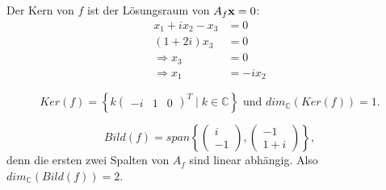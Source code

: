\documentclass{../mfa}
\begin{document}
Der Kern von $f$ ist der Lösungsraum von $A_f\mathbf{x} = 0$:
\begin{align*}
   x_1 + ix_2 -x_3 & = 0     \\
   (1+2i)x_3       & = 0     \\
   \Rightarrow x_3 & = 0     \\
   \Rightarrow x_1 & = -ix_2
\end{align*}

\newcommand{\inlinepmatrix}[1]{\begin{pmatrix}#1\end{pmatrix}}

\begin{equation*}
   Ker(f) = \left\{k \begin{pmatrix}-i & 1 & 0\end{pmatrix}^T \mid k \in
\mathbb{C} \right\} \text{ und } dim_\mathbb{C}(Ker(f)) = 1.
\end{equation*}

\begin{equation*}
   Bild(f) = span\left\{\inlinepmatrix{i \\ -1}, \inlinepmatrix{-1 \\
   1+i}\right\},
\end{equation*}
denn die ersten zwei Spalten von $A_f$ sind linear abhängig.
Also $dim_\mathbb{C}(Bild(f)) = 2$.
\end{document}

